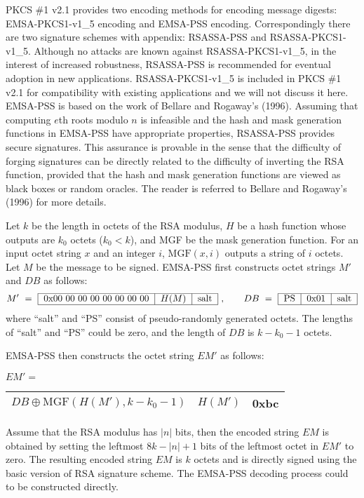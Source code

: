 \documentclass{article}
\begin{document}
PKCS \#1 v2.1 provides two encoding methods
for encoding message digests: EMSA-PKCS1-v1\_5 encoding
and EMSA-PSS encoding. Correspondingly there are 
two signature schemes with appendix: 
RSASSA-PSS and RSASSA-PKCS1-v1\_5. Although no attacks are known 
against RSASSA-PKCS1-v1\_5, in the interest of increased robustness, 
RSASSA-PSS is recommended for eventual adoption in new applications. 
RSASSA-PKCS1-v1\_5 is included in PKCS \#1 v2.1 for compatibility 
with existing applications and we will not discuss it here.
EMSA-PSS is based on the work of Bellare and Rogaway's (1996).
Assuming that computing $e$th roots modulo $n$ is infeasible and 
the hash and mask generation functions in EMSA-PSS have appropriate 
properties, RSASSA-PSS provides secure signatures. This assurance 
is provable in the sense that the difficulty of forging signatures 
can be directly related to the difficulty of inverting the RSA 
function, provided that the hash and mask generation functions 
are viewed as black boxes or random oracles. The reader is referred to
Bellare and Rogaway's (1996) for more details.

Let $k$ be the length in octets of the RSA modulus,
$H$ be a hash function whose outputs are
$k_0$ octets ($k_0<k$), and MGF be the mask generation function. For 
an input octet string $x$ and an integer $i$, $\mbox{MGF}(x, i)$ 
outputs a string of $i$ octets. Let $M$ be the message to be signed.
EMSA-PSS first constructs octet strings $M'$ and $DB$ as follows:
$$
M' \ = \  \begin{tabular}{|c|c|c|}\hline
0x00 00 00 00 00 00 00 00 & \mbox{$H(M)$} & salt\\ \hline
\end{tabular}\ ,
\quad \quad 
DB\ = \  \begin{tabular}{|c|c|c|}\hline
PS & 0x01 & salt\\ \hline
\end{tabular}
$$
where ``salt'' and ``PS'' consist of pseudo-randomly generated octets.
The lengths of ``salt'' and ``PS''  could be zero, and the length of 
$DB$ is $k-k_0-1$ octets.

EMSA-PSS then constructs the octet string $EM'$ as follows:
\begin{center}
$EM'=\ \ $\begin{tabular}{|c|c|c|}\hline
$DB\oplus\mbox{MGF}(H(M'),k-k_0-1)$ & $H(M')$ & 0xbc \\ \hline
\end{tabular}
\end{center}
Assume that the RSA modulus has $|n|$ bits, then the encoded
string $EM$ is obtained by setting the leftmost
$8k-|n|+1$ bits of the leftmost octet in $EM'$ to zero.
The resulting encoded string $EM$ is $k$ octets and is directly 
signed using the basic version of
RSA signature scheme. 
The EMSA-PSS decoding process could to be constructed
directly.
\end{document}
